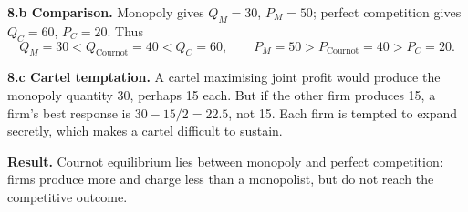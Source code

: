 \documentclass[11pt,a4paper]{article}
\begin{document}
\begin{center}
\end{center}

\textbf{8.b Comparison.} Monopoly gives \(Q_M=30\), \(P_M=50\); perfect
competition gives \(Q_C=60\), \(P_C=20\). Thus
\[
\boxed{Q_M=30<Q_{\mathrm{Cournot}}=40<Q_C=60},\qquad
\boxed{P_M=50>P_{\mathrm{Cournot}}=40>P_C=20}.
\]

\textbf{8.c Cartel temptation.} A cartel maximising joint profit would produce
the monopoly quantity 30, perhaps 15 each. But if the other firm produces 15,
a firm's best response is \(30-15/2=22.5\), not 15. Each firm is tempted to
expand secretly, which makes a cartel difficult to sustain.

\begin{solutionbox}
\textbf{Result.} Cournot equilibrium lies between monopoly and perfect
competition: firms produce more and charge less than a monopolist, but do not
reach the competitive outcome.
\end{solutionbox}
\end{document}
